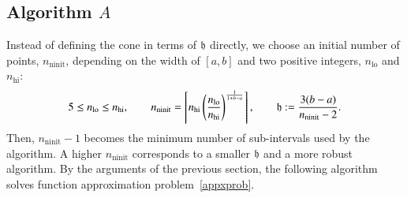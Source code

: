 \documentclass[review]{elsarticle}
\theoremstyle{definition}
\DeclareMathOperator{\lo}{lo}
\DeclareMathOperator{\ninit}{ninit}
\begin{document}
\subsection{Algorithm $A$} \label{subsec:appxalgo}
Instead of defining the cone in terms of $\mathfrak{h}$ directly, we choose an initial number of points, $n_{\ninit}$, depending on the width of $[a,b]$ and two positive integers, $n_{\lo}$ and $n_{\text{hi}}$:
\begin{equation}
\label{nodefinition}
5 \le n_{\lo} \le n_{\text{hi}}, \qquad n_{\ninit} = \left\lceil n_{\text{hi}}
\left(\frac{n_{\lo}}{n_{\text{hi}}}\right)^{\frac{1}{1+b-a}}\right\rceil,  \qquad \fh := \frac{3(b-a)}{n_{\ninit}-2}.
\end{equation}
Then, $n_{\ninit} -1$ becomes the minimum number of sub-intervals used by the algorithm.  A higher $n_{\ninit}$ corresponds to a smaller $\mathfrak{h}$ and a more robust algorithm.  By the arguments of the previous section, the following algorithm solves function approximation problem~\eqref{appxprob}.
\end{document}

